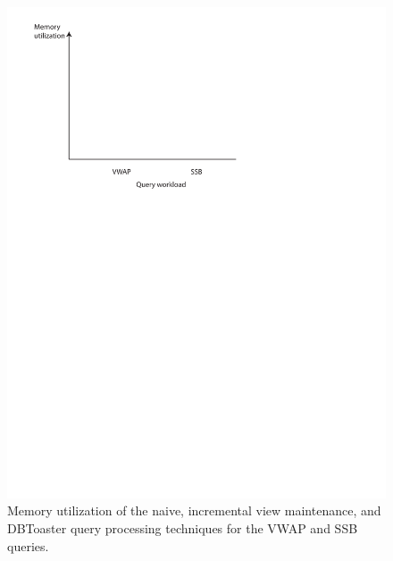 {\begin{figure}
\includegraphics[scale=0.6]{figures/axes-memvsquery.pdf}
\caption{Memory utilization of the naive, incremental view maintenance, and
DBToaster query processing techniques for the VWAP and SSB queries.}
\label{fig:memutil-vsquery}
\end{figure}
}



